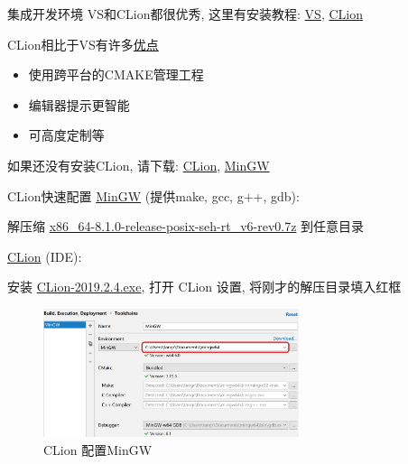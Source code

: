 \begin{frame}[fragile]{集成开发环境}
VS和CLion都很优秀, 这里有安装教程:
\href{http://problemoverflow.top/c/0.%E5%BC%80%E5%8F%91%E7%8E%AF%E5%A2%83%E6%90%AD%E5%BB%BA/0.0.Microsoft_Visual_Studio.html}{VS},
\href{http://problemoverflow.top/c/0.%E5%BC%80%E5%8F%91%E7%8E%AF%E5%A2%83%E6%90%AD%E5%BB%BA/0.1.CLion.html}{CLion}

CLion相比于VS有许多\href{http://problemoverflow.top/index.php?qa=33&qa_1=%E6%89%80%E4%BB%A5%E5%88%B0%E5%BA%95%E7%94%A8%E4%BB%80%E4%B9%88-ide-%E5%86%99-oj%EF%BC%9F&show=36#a36}{优点}
\begin{itemize}
\item 使用跨平台的CMAKE管理工程
\item 编辑器提示更智能
\item 可高度定制等
\end{itemize}
如果还没有安装CLion, 请下载: \href{https://www.jetbrains.com/clion/download}{CLion}, \href{https://nchc.dl.sourceforge.net/project/mingw-w64/Toolchains%20targetting%20Win64/Personal%20Builds/mingw-builds/8.1.0/threads-posix/seh/x86_64-8.1.0-release-posix-seh-rt_v6-rev0.7z}{MinGW}
\end{frame}

\begin{frame}[fragile]{CLion快速配置}
\href{https://nchc.dl.sourceforge.net/project/mingw-w64/Toolchains%20targetting%20Win64/Personal%20Builds/mingw-builds/8.1.0/threads-posix/seh/x86_64-8.1.0-release-posix-seh-rt_v6-rev0.7z}{MinGW} (提供make, gcc, g++, gdb):

解压缩 \href{https://nchc.dl.sourceforge.net/project/mingw-w64/Toolchains%20targetting%20Win64/Personal%20Builds/mingw-builds/8.1.0/threads-posix/seh/x86_64-8.1.0-release-posix-seh-rt_v6-rev0.7z}{x86\_64-8.1.0-release-posix-seh-rt\_v6-rev0.7z} 到任意目录

\emptyline
\href{https://www.jetbrains.com/clion/download}{CLion} (IDE):

安装 \href{https://www.jetbrains.com/clion/download}{CLion-2019.2.4.exe}, 打开 CLion 设置, 将刚才的解压目录填入红框
\begin{figure}[ht!]
\centering
\includegraphics[width=75mm]{figs/clion_mingw.png}
\caption{CLion 配置MinGW}
\end{figure}
\end{frame}

